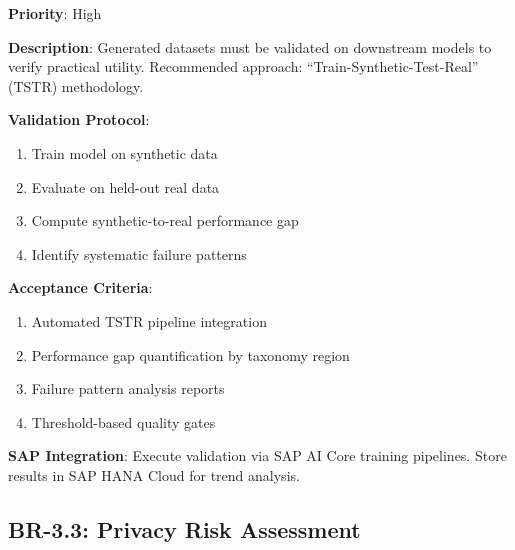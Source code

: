 \begin{tcolorbox}[colback=yellow!5,colframe=yellow!70,title=BR-3.2: Downstream Model Validation]
\textbf{Priority}: High

\textbf{Description}: Generated datasets must be validated on downstream models
to verify practical utility. Recommended approach: ``Train-Synthetic-Test-Real''
(TSTR) methodology.

\textbf{Validation Protocol}:
\begin{enumerate}
  \item Train model on synthetic data
  \item Evaluate on held-out real data
  \item Compute synthetic-to-real performance gap
  \item Identify systematic failure patterns
\end{enumerate}

\textbf{Acceptance Criteria}:
\begin{enumerate}
  \item Automated TSTR pipeline integration
  \item Performance gap quantification by taxonomy region
  \item Failure pattern analysis reports
  \item Threshold-based quality gates
\end{enumerate}

\textbf{SAP Integration}: Execute validation via SAP AI Core training pipelines.
Store results in SAP HANA Cloud for trend analysis.
\end{tcolorbox}

\subsection{BR-3.3: Privacy Risk Assessment}

